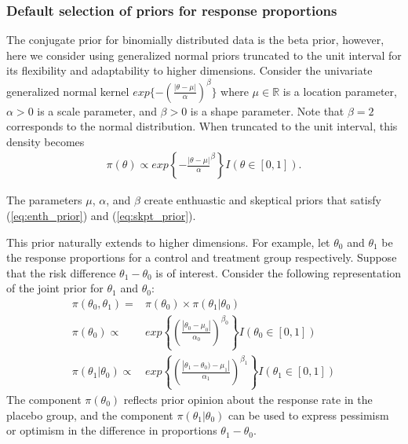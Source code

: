 \documentclass[12pt]{article}
\begin{document}
\subsubsection{Default selection of priors for response proportions}
The conjugate prior for binomially distributed data is the beta prior, however, here we consider using generalized normal priors truncated to the unit interval for its flexibility and adaptability to higher dimensions.
Consider the univariate generalized normal kernel $exp\{-(\frac{|\theta-\mu|}{\alpha})^\beta\}$ where $\mu\in\mathbb{R}$ is a location parameter, $\alpha>0$ is a scale parameter, and $\beta>0$ is a shape parameter. Note that $\beta=2$ corresponds to the normal distribution. When truncated to the unit interval, this density becomes
\begin{align}\label{eq:generalized_normal_univariate}
\pi(\theta)\propto exp\left\{-\frac{|\theta-\mu|}{\alpha}^\beta\right\} I(\theta\in[0,1]).
\end{align}

The parameters $\mu$, $\alpha$, and $\beta$ create enthuastic and skeptical priors that satisfy (\ref{eq:enth_prior}) and (\ref{eq:skpt_prior}).

This prior naturally extends to higher dimensions. For example, let $\theta_0$ and $\theta_1$ be the response proportions for a control and treatment group respectively. Suppose that the risk difference $\theta_1-\theta_0$ is of interest.
Consider the following representation of the joint prior for $\theta_1$ and $\theta_0$:
\begin{align*}
\pi(\theta_0,\theta_1)=&\pi(\theta_0)\times\pi(\theta_1|\theta_0)\\
\pi(\theta_0)\propto&exp\left\{\left(\frac{|\theta_0-\mu_0|}{\alpha_0}\right)^{\beta_0}\right\}I(\theta_0\in[0,1])\\
\pi(\theta_1|\theta_0)\propto&exp\left\{\left(\frac{|\theta_1-\theta_0)-\mu_1|}{\alpha_1}\right)^{\beta_1}\right\}I(\theta_1\in[0,1])
\end{align*}
The component $\pi(\theta_0)$ reflects prior opinion about the response rate in the placebo group, and the component $\pi(\theta_1|\theta_0)$ can be used to express pessimism or optimism in the difference in proportions $\theta_1 - \theta_0$. 
\end{document}
